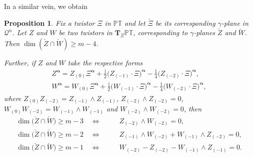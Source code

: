 \documentclass[10pt,a4paper]{amsart}
\numberwithin{equation}{section}
\newtheorem{Proposition}[Theorem]{Proposition}
 { \theoremstyle{definition}
\newtheorem{Definition}[Theorem]{Definition}
\newtheorem{Example}[Theorem]{Example}
\newtheorem{Remark}[Theorem]{Remark} }
\newcommand{\mbf} [1]{\mathbf{#1}}
\newcommand{\mc} [1]{\mathcal{#1}}
\newcommand{\ii} {\mathrm{i}}
\newcommand{\PT} {\mathbb{PT}}
\begin{document}
In a similar vein, we obtain
\begin{Proposition}\label{prop-geometric-T}
Fix a twistor $\Xi$ in $\PT$ and let $\check{\Xi }$ be its corresponding $\gamma$-plane in $\mc{Q}^n$. Let $Z$ and $W$ be two twistors in $\mbf{T}_\Xi \PT$, corresponding to $\gamma$-planes $\check{Z}$ and $\check{W}$. Then $\dim ( \check{Z} \cap \check{W} ) \geq m-4$.

Further, if $Z$ and $W$ take the respective forms
\begin{gather*}%
Z^{\bm{\upalpha}} = Z_{(0)} \Xi^{\bm{\upalpha}} + \tfrac{\ii}{2} \big( Z_{(-1)} \cdot \Xi \big)^{\bm{\upalpha}} - \tfrac{1}{4} \big( Z_{(-2)} \cdot \Xi\big)^{\bm{\upalpha}} , \\
W^{\bm{\upalpha}} = W_{(0)} \Xi^{\bm{\upalpha}} + \tfrac{\ii}{2} \big( W_{(-1)} \cdot \Xi \big)^{\bm{\upalpha}} - \tfrac{1}{4} \big( W_{(-2)} \cdot \Xi\big)^{\bm{\upalpha}} ,
\end{gather*}
where $Z_{(0)} Z_{(-2)} = Z_{(-1)} \wedge Z_{(-1)}$, $Z_{(-2)} \wedge Z_{(-2)} = 0$, $W_{(0)} W_{(-2)} = W_{(-1)} \wedge W_{(-1)}$ and $W_{(-2)} \wedge W_{(-2)} = 0$, then
\begin{subequations}
\begin{alignat}{3}
& \dim \big( \check{Z} \cap \check{W} \big) \geq m-3 \quad \Longleftrightarrow \quad & & Z_{(-2)} \wedge W_{(-2)} = 0 ,& \label{eq-inter3} \\
& \dim \big( \check{Z} \cap \check{W} \big) \geq m-2 \quad \Longleftrightarrow \quad & & Z_{(-1)} \wedge W_{(-2)} + W_{(-1)} \wedge Z_{(-2)} = 0 , & \label{eq-inter2} \\
& \dim \big( \check{Z} \cap \check{W} \big) \geq m-1\quad \Longleftrightarrow \quad & & W_{(-2)} - Z_{(-2)} - W_{(-1)} \wedge Z_{(-1)} = 0 . & \label{eq-inter1}
\end{alignat}
\end{subequations}
\end{Proposition}
\end{document}
